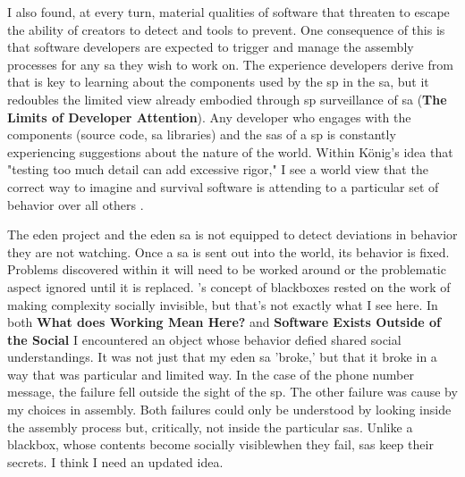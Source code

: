 \documentclass[a4paper,man,natbib,floatsintext]{apa6}
\begin{document}
  I also found, at every turn, material qualities of software that threaten to escape the ability of creators to detect and tools to prevent. One consequence of this is that software developers are expected to trigger and manage the assembly processes for any \gls{sa} they wish to work on. The experience developers derive from that is key to learning about the components used by the \gls{sp} in the \gls{sa}, but it redoubles the limited view already embodied through \gls{sp} surveillance of \gls{sa} (\textbf{The Limits of Developer Attention}). Any developer who engages with the components (source code, \gls{sa} libraries) and the \glspl{sa} of a \gls{sp} is constantly experiencing suggestions about the nature of the world. Within König's idea that "testing too much detail can add excessive rigor," I see a world view that the correct way to imagine and survival software is attending to a particular set of behavior over all others \citep{Konig2020-yx}.

  The \acrshort{eden} project and the \acrshort{eden} \gls{sa} is not equipped to detect deviations in behavior they are not watching. Once a \gls{sa} is sent out into the world, its behavior is fixed. Problems discovered within it will need to be worked around or the problematic aspect ignored until it is replaced. \citet{Latour1999-ui}'s concept of blackboxes rested on the work of making complexity socially invisible, but that's not exactly what I see here. In both \textbf{What does Working Mean Here?} and \textbf{Software Exists Outside of the Social} I encountered an object whose behavior defied shared social understandings. It was not just that my \acrshort{eden} \gls{sa} 'broke,' but that it broke in a way that was particular and limited way. In the case of the phone number message, the failure fell outside the sight of the \gls{sp}. The other failure was cause by my choices in assembly. Both failures could only be understood by looking inside the assembly process but, critically, not inside the particular \glspl{sa}. Unlike a blackbox, whose contents become socially visible\footnotemark when they fail, \glspl{sa} keep their secrets. I think I need an updated idea. 

\end{document}
